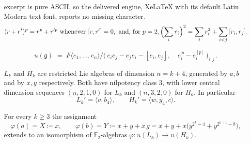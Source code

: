 \documentclass[10pt,a4paper]{amsart}
\newcommand{\Ft}{\mathbb{F}_2}
\newcommand{\spann}[1]{\langle #1\rangle}
\begin{document}
excerpt is pure ASCII, so the delivered engine, XeLaTeX with its default Latin Modern text font, reports no missing character.
\begin{equation}\label{eq:square}
(r+r')^p=r^p+r'^p \text{ whenever } [r,r']=0,
\text{ and, for } p=2,
\Bigl(\sum_i r_i\Bigr)^{2}=\sum_i r_i^{2}+\sum_{i<j}\,[r_i,r_j].
\end{equation}

\begin{equation*}
u(\mathfrak{g})\;=\;F\langle e_1,\dots,e_n\rangle\Big/
\bigl(\,e_ie_j-e_je_i-[e_i,e_j],\quad e_i^{\,p}-e_i^{[p]}\,\bigr)_{i,j}\,.
\tag{P}\label{eq:pres}
\end{equation*}

\begin{lemma}\label{lem:valid2}
$L_k$ and $H_k$ are restricted Lie algebras of dimension $n=k+4$, generated
by $a,b$ and by $x,y$ respectively. Both have nilpotency class $3$, with
lower central dimension sequences $(n,2,1,0)$ for $L_k$ and $(n,3,2,0)$ for
$H_k$. In particular
\[
L_k'=\spann{v,b_4},\qquad H_k'=\spann{w,y_4,c}.
\]
\end{lemma}

\begin{theorem}\label{thm:char2}
For every $k\ge3$ the assignment
\[
\varphi(a)=X\coloneqq x,\qquad
\varphi(b)=Y\coloneqq x+y+x\,g
= x+y+x\bigl(y^{2^{k}-4}+y^{2^{k+1}-8}\bigr),
\]
extends to an isomorphism of $\Ft$-algebras
$\varphi\colon u(L_k)\to u(H_k)$.
\end{theorem}
\end{document}
